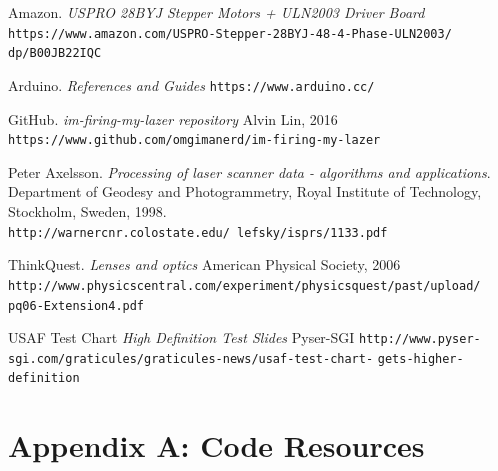 \documentclass[letterpaper, 12pt]{article}
\begin{document}
\begin{thebibliography}{9}

  Amazon.
  \textit{USPRO 28BYJ Stepper Motors + ULN2003 Driver Board}
  \texttt{https://www.amazon.com/USPRO-Stepper-28BYJ-48-4-Phase-ULN2003/}
  \texttt{dp/B00JB22IQC}

  Arduino.
  \textit{References and Guides}\newline
  \texttt{https://www.arduino.cc/}

  GitHub.
  \textit{im-firing-my-lazer repository}
  Alvin Lin, 2016\newline
  \texttt{https://www.github.com/omgimanerd/im-firing-my-lazer}

  Peter Axelsson.
  \textit{Processing of laser scanner data - algorithms and applications}.
  Department of Geodesy and Photogrammetry, Royal Institute of Technology, Stockholm, Sweden, 1998.\newline
  \texttt{http://warnercnr.colostate.edu/~lefsky/isprs/1133.pdf}

  ThinkQuest.
  \textit{Lenses and optics}
  American Physical Society, 2006\newline
  \texttt{http://www.physicscentral.com/experiment/physicsquest/past/upload/}
  \texttt{pq06-Extension4.pdf}

  USAF Test Chart
  \textit{High Definition Test Slides}
  Pyser-SGI\newline
  \texttt{http://www.pyser-sgi.com/graticules/graticules-news/usaf-test-chart-}
  \texttt{gets-higher-definition}

\end{thebibliography}

\newpage

\appendix
\section{Appendix A: Code Resources}
\end{document}
